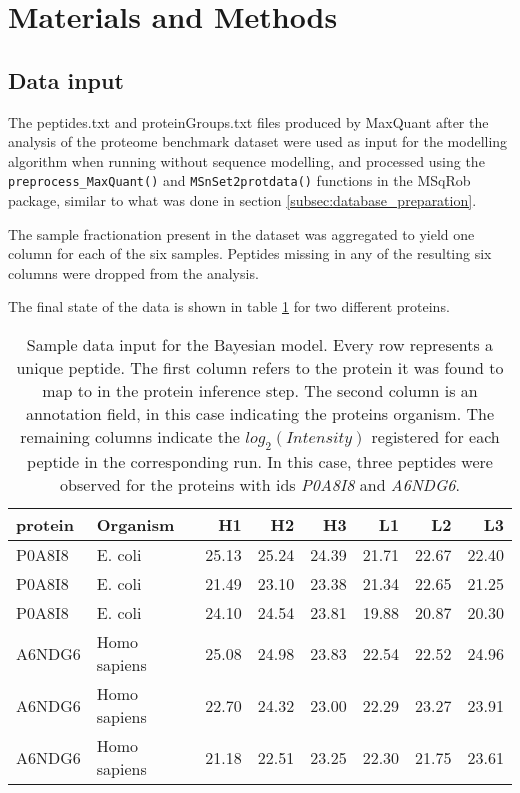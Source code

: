 \section{Materials and Methods}

\subsection{Data input}
\label{subsec:data_input}

The peptides.txt and proteinGroups.txt files produced by MaxQuant \cite{Cox2008} after the analysis of the proteome benchmark dataset \cite{Cox2014} were used as input for the modelling algorithm when running without sequence modelling, and processed using the \texttt{preprocess\_MaxQuant()} and \texttt{MSnSet2protdata()} functions in the MSqRob \cite{Goeminne2016} package, similar to what was done in section \ref{subsec:database_preparation}.

The sample fractionation present in the dataset was aggregated to yield one column for each of the six samples. Peptides missing in any of the resulting six columns were dropped from the analysis.

The final state of the data is shown in table \ref{tab:data_model} for two different proteins.

\begin{table}
\begin{tabular}{llrrrrrr}
\toprule
protein &      Organism &     H1 &     H2 &     H3 &     L1 &     L2 &     L3 \\
\midrule
 P0A8I8 &       E. coli &  25.13 &  25.24 &  24.39 &  21.71 &  22.67 &  22.40 \\
 P0A8I8 &       E. coli &  21.49 &  23.10 &  23.38 &  21.34 &  22.65 &  21.25 \\
 P0A8I8 &       E. coli &  24.10 &  24.54 &  23.81 &  19.88 &  20.87 &  20.30 \\
 A6NDG6 &  Homo sapiens &  25.08 &  24.98 &  23.83 &  22.54 &  22.52 &  24.96 \\
 A6NDG6 &  Homo sapiens &  22.70 &  24.32 &  23.00 &  22.29 &  23.27 &  23.91 \\
 A6NDG6 &  Homo sapiens &  21.18 &  22.51 &  23.25 &  22.30 &  21.75 &  23.61 \\
\bottomrule
\end{tabular}
\caption[BayesQuant data input]{Sample data input for the Bayesian model. Every row represents a unique peptide. The first column refers to the protein it was found to map to in the protein inference step. The second column is an annotation field, in this case indicating the protein\textquotesingle s organism. The remaining columns indicate the $log_2(Intensity)$ registered for each peptide in the corresponding run. In this case, three peptides were observed for the proteins with ids \textit{P0A8I8} and \textit{A6NDG6}.}
\label{tab:data_model}
\end{table}

